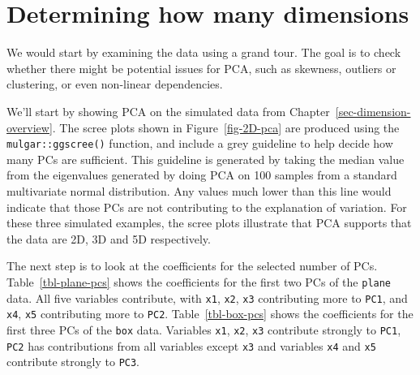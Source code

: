 \documentclass[
  letterpaper,
]{krantz}
\begin{document}
\section{Determining how many
dimensions}\label{determining-how-many-dimensions}

We would start by examining the data using a grand tour. The goal is to
check whether there might be potential issues for PCA, such as skewness,
outliers or clustering, or even non-linear dependencies.

We'll start by showing PCA on the simulated data from
Chapter~\ref{sec-dimension-overview}. The scree plots shown in
Figure~\ref{fig-2D-pca} are produced using the
\texttt{mulgar::ggscree()} function, and include a grey guideline to
help decide how many PCs are sufficient. This guideline is generated by
taking the median value from the eigenvalues generated by doing PCA on
100 samples from a standard multivariate normal distribution. Any values
much lower than this line would indicate that those PCs are not
contributing to the explanation of variation. For these three simulated
examples, the scree plots illustrate that PCA supports that the data are
2D, 3D and 5D respectively.


The next step is to look at the coefficients for the selected number of
PCs. Table~\ref{tbl-plane-pcs} shows the coefficients for the first two
PCs of the \texttt{plane} data. All five variables contribute, with
\texttt{x1}, \texttt{x2}, \texttt{x3} contributing more to \texttt{PC1},
and \texttt{x4}, \texttt{x5} contributing more to \texttt{PC2}.
Table~\ref{tbl-box-pcs} shows the coefficients for the first three PCs
of the \texttt{box} data. Variables \texttt{x1}, \texttt{x2},
\texttt{x3} contribute strongly to \texttt{PC1}, \texttt{PC2} has
contributions from all variables except \texttt{x3} and variables
\texttt{x4} and \texttt{x5} contribute strongly to \texttt{PC3}.


\begin{table}

\caption{\label{tbl-plane-pcs}Coefficients for the first two PCs for the
plane data.}


\end{table}%
\end{document}
